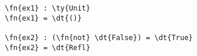 
\begin{Verbatim}
\fn{ex1} : \ty{Unit}
\fn{ex1} = \dt{()}

\fn{ex2} : (\fn{not} \dt{False}) = \dt{True}
\fn{ex2} = \dt{Refl}
\end{Verbatim}





